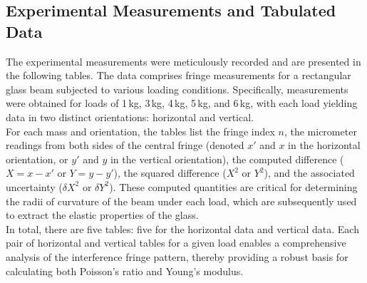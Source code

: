 \documentclass[a4paper,11pt]{article}
\begin{document}
\subsection{Experimental Measurements and Tabulated Data}
\label{subsec:DATA}
\noindent

The experimental measurements were meticulously recorded and are presented in the following tables. The data comprises fringe measurements for a rectangular glass beam subjected to various loading conditions. Specifically, measurements were obtained for loads of 1\,kg, 3\,kg, 4\,kg, 5\,kg, and 6\,kg, with each load yielding data in two distinct orientations: horizontal and vertical.\\

For each mass and orientation, the tables list the fringe index \(n\), the micrometer readings from both sides of the central fringe (denoted \(x'\) and \(x\) in the horizontal orientation, or \(y'\) and \(y\) in the vertical orientation), the computed difference (\(X = x - x'\) or \(Y = y - y'\)), the squared difference (\(X^2\) or \(Y^2\)), and the associated uncertainty (\(\delta X^2\) or \(\delta Y^2\)). These computed quantities are critical for determining the radii of curvature of the beam under each load, which are subsequently used to extract the elastic properties of the glass.\\

In total, there are five tables: five for the horizontal data and vertical data. Each pair of horizontal and vertical tables for a given load enables a comprehensive analysis of the interference fringe pattern, thereby providing a robust basis for calculating both Poisson's ratio and Young's modulus.\\ 
\end{document}
